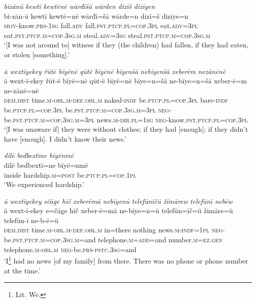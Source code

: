 \ea \label{ŽM.29}
\textit{bizānū kewtī kewtēnē wārđīšā wārden dizīš dizīyen} \\ 
\gll bi-zān-ū kewtī kewtē=nē wārđī=šā wārde=n dizī=š dizīye=n \\ 
 \textsc{sbjv-}know\textsc{.prs}\textsc{-\textsc{1sg}} fall\textsc{.adv} fall\textsc{.pst}\textsc{.ptcp}\textsc{.pl}\textsc{=cop}\textsc{.3pl} eat\textsc{.adv}\textsc{=3pl} eat\textsc{.pst}\textsc{.ptcp}\textsc{.m}\textsc{=cop}\textsc{.3sg}\textsc{.m} steal\textsc{.adv}\textsc{=3sg} steal\textsc{.pst}\textsc{.ptcp}\textsc{.m}\textsc{=cop}\textsc{.3sg}\textsc{.m} \\ 
\glt `[I was not around to] witness if they (the children) had fallen, if they had eaten, or stolen [something].'
\z 
 
\ea \label{ŽM.30}
\textit{ā wextīyekey řūtē bīyēnē qūtē bīyēnē bīyenšā nebīyenšā xeberēm nezānēnē} \\ 
\gll ā wext-ī-ekey řūt-ē bīyē=nē qūt-ē bīyē=nē bīye=n=šā ne-bīye=n=šā xeber-ē=m ne-zānē=nē \\ 
 \textsc{dem.dist} time\textsc{.m}\textsc{-obl}\textsc{.m}\textsc{-def}\textsc{.obl}\textsc{.m} naked\textsc{-indf} be\textsc{.ptcp}\textsc{.pl}\textsc{=cop}\textsc{.3pl} bare\textsc{-indf} be\textsc{.ptcp}\textsc{.pl}\textsc{=cop}\textsc{.3pl} be\textsc{.pst}\textsc{.ptcp}\textsc{.m}\textsc{=cop}\textsc{.3sg}\textsc{.m}\textsc{=3pl} \textsc{neg-}be\textsc{.pst}\textsc{.ptcp}\textsc{.m}\textsc{=cop}\textsc{.3sg}\textsc{.m}\textsc{=3pl} news\textsc{.m}\textsc{-dir}\textsc{.pl}\textsc{=\textsc{1sg}} \textsc{neg-}know\textsc{.pst}\textsc{.ptcp}\textsc{.pl}\textsc{=cop}\textsc{.3pl} \\ 
\glt `[I was unaware if] they were without clothes; if they had [enough]; if they didn’t have [enough]. I didn't know their news.'
\z 
 
\ea \label{ŽM.31}
\textit{dilē bedbextīne bīyēnmē} \\ 
\gll dilē bedbextī=ne bīyē=nmē \\ 
 inside hardship\textsc{.m}\textsc{=\textsc{post}} be\textsc{.ptcp}\textsc{.pl}\textsc{=cop}\textsc{.\textsc{1pl}} \\ 
\glt `We experienced hardship.'
\z 
 
\ea \label{ŽM.32}
\textit{ā wextīyekey ečāge hīč xeberēmā nebīyenū telefūnīčū žimārew telefūnī nebēw} \\ 
\gll ā wext-ī-ekey e=čāge hīč xeber-ē=mā ne-bīye=n=ū telefūn=īč=ū žimāre=ū telefūn-ī ne-b-ē=ū \\ 
 \textsc{dem.dist} time\textsc{.m}\textsc{-obl}\textsc{.m}\textsc{-def}\textsc{.obl}\textsc{.m} in=there nothing news\textsc{.m}\textsc{-indf}\textsc{=\textsc{1pl}} \textsc{neg-}be\textsc{.pst}\textsc{.ptcp}\textsc{.m}\textsc{=cop}\textsc{.3sg}\textsc{.m}=and telephone\textsc{.m}\textsc{=add}=and number\textsc{.m}\textsc{=ez.gen} telephone\textsc{.m}\textsc{-obl}\textsc{.m} \textsc{neg-}be\textsc{.prs}\textsc{-pstc}\textsc{.3sg}=and \\ 
\glt `I\footnote{Lit. We.}  had no news [of my family] from there. There was no phone or phone number at the time.'
\z 
 
